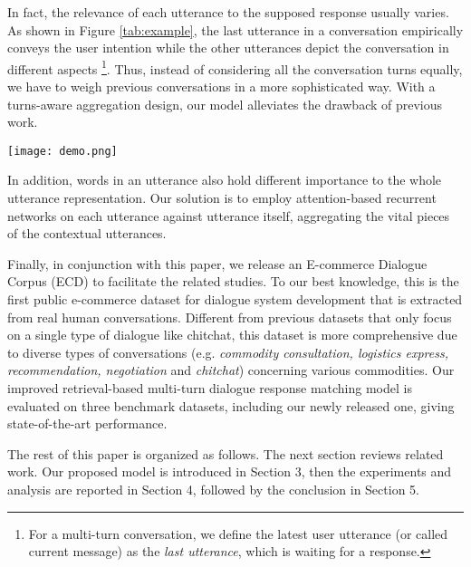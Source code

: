 \documentclass[11pt]{article}
\begin{document}
In fact, the relevance of each utterance to the supposed response usually varies. As shown in Figure \ref{tab:example}, the last utterance in a conversation empirically conveys the user intention while the other utterances depict the conversation in different aspects \footnote{For a multi-turn conversation, we define the latest  user utterance (or called current message) as the \emph{last utterance}, which is waiting for a response.}. Thus, instead of considering all the conversation turns equally, we have to weigh previous conversations in a more sophisticated way. With a turns-aware aggregation design, our model alleviates the drawback of previous work.


\begin{figure*}
	\centering
	\texttt{[image: demo.png]}
	\caption{\label{tab:example} An example of E-commerce Dialogue Corpus.}
\end{figure*}

In addition, words in an utterance also hold different importance to the whole utterance representation. Our solution is to employ attention-based recurrent networks on each utterance against utterance itself, aggregating the vital pieces of the contextual utterances.

Finally, in conjunction with this paper, we release an E-commerce Dialogue Corpus (ECD) to facilitate the related studies. To our best knowledge, this is the first public e-commerce dataset for dialogue system development that is extracted from real human conversations. Different from previous datasets that only focus on a single type of dialogue like chitchat, this dataset is more comprehensive due to diverse types of conversations (e.g. \emph{commodity consultation, logistics express, recommendation, negotiation} and \emph{chitchat}) concerning various commodities. Our improved retrieval-based multi-turn dialogue response matching model is evaluated on three benchmark datasets, including our newly released one, giving state-of-the-art performance.

The rest of this paper is organized as follows. The next section reviews related work. Our proposed model is introduced in Section 3, then the experiments and analysis are reported in Section 4, followed by the conclusion in Section 5.
\end{document}
